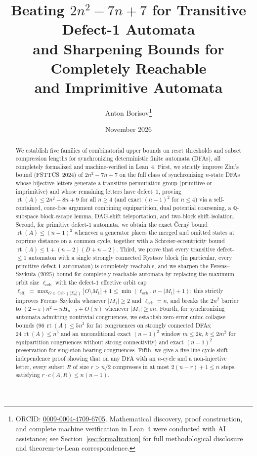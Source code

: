 \documentclass[11pt,a4paper]{article}
\title{Beating $2n^2 - 7n + 7$ for Transitive Defect-1 Automata\\
and Sharpening Bounds for Completely Reachable\\
and Imprimitive Automata}
\author{Anton Borisov\thanks{ORCID: \href{https://orcid.org/0009-0004-4709-6705}{0009-0004-4709-6705}. Mathematical discovery, proof construction, and complete machine verification in Lean~4 were conducted with AI assistance; see Section~\ref{sec:formalization} for full methodological disclosure and theorem-to-Lean correspondence.}}
\date{November 2026}
\theoremstyle{definition}
\theoremstyle{remark}
\newcommand{\rt}{\operatorname{rt}}
\newcommand{\Orb}{\operatorname{Orb}}
\newcommand{\leff}{\ell_{\mathrm{eff}_1}}
\newcommand{\lorb}{\ell_{\mathrm{orb}}}
\begin{document}
\maketitle

\begin{abstract}
We establish five families of combinatorial upper bounds on reset thresholds and subset compression lengths for synchronizing deterministic finite automata (DFAs), all completely formalized and machine-verified in Lean~4.
First, we strictly improve Zhu's bound (FSTTCS~2024) of $2n^2 - 7n + 7$ on the full class of synchronizing $n$-state DFAs whose bijective letters generate a transitive permutation group (primitive or imprimitive) and whose remaining letters have defect~$1$, proving $\rt(A) \le 2n^2 - 8n + 9$ for all $n \ge 4$ (and exact $(n-1)^2$ for $n \le 4$) via a self-contained, cone-free argument combining equipartition, dual potential coarsening, a $\mathbb{Q}$-subspace block-escape lemma, DAG-shift teleportation, and two-block shift-isolation.
Second, for primitive defect-$1$ automata, we obtain the exact \v{C}ern\'y bound $\rt(A) \le (n-1)^2$ whenever a generator places the merged and omitted states at coprime distance on a common cycle, together with a Schreier-eccentricity bound $\rt(A) \le 1 + (n-2)(D + n - 2)$.
Third, we prove that every transitive defect-$\le 1$ automaton with a single strongly connected Rystsov block (in particular, every primitive defect-$1$ automaton) is completely reachable, and we sharpen the Ferens--Szyku\l a (2025) bound for completely reachable automata by replacing the maximum orbit size $\lorb$ with the defect-$1$ effective orbit cap $\leff = \max_{O \in \Orb(\langle\Sigma_0\rangle)} |O \setminus M_1| + 1 \le \min(\lorb, n - |M_1| + 1)$; this strictly improves Ferens--Szyku\l a whenever $|M_1| \ge 2$ and $\lorb = n$, and breaks the $2n^2$ barrier to $(2 - \varepsilon)n^2 - n H_{n-2} + O(n)$ whenever $|M_1| \ge \varepsilon n$.
Fourth, for synchronizing automata admitting nontrivial congruences, we establish zero-error cubic collapse bounds ($96\,\rt(A) \le 5n^3$ for fat congruences on strongly connected DFAs; $24\,\rt(A) \le n^3$ and an unconditional exact $(n-1)^2$ window $m \le 2k,\, k \le 2m^2$ for equipartition congruences without strong connectivity) and exact $(n-1)^2$ preservation for singleton-bearing congruences.
Fifth, we give a five-line cycle-shift independence proof showing that on any DFA with an $n$-cycle and a non-injective letter, every subset $R$ of size $r > n/2$ compresses in at most $2(n - r) + 1 \le n$ steps, satisfying $r \cdot c(A, R) \le n(n - 1)$.
\end{abstract}
\end{document}
